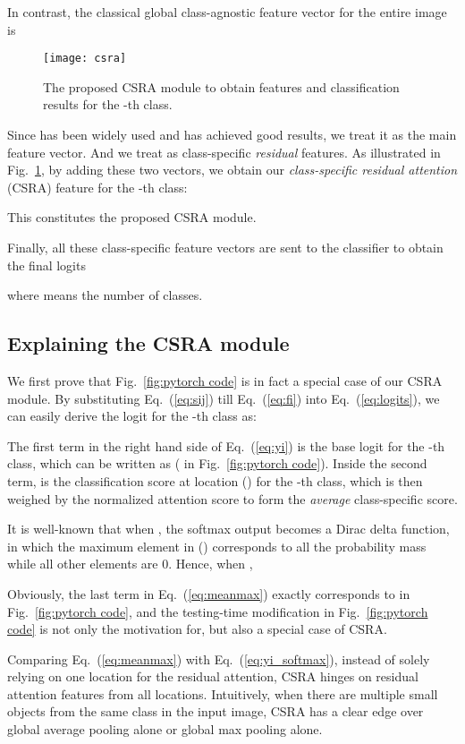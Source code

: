 \documentclass[10pt,twocolumn,letterpaper]{article}
\begin{document}
In contrast, the classical global class-agnostic feature vector for the entire image is


\begin{figure}
	\centering
	\texttt{[image: csra]}
	\caption{The proposed CSRA module to obtain features and classification results for the -th class.}
	\label{fig:CSRA}
\end{figure}

Since  has been widely used and has achieved good results, we treat it as the main feature vector. And we treat  as class-specific \emph{residual} features. As illustrated in Fig.~\ref{fig:CSRA}, by adding these two vectors, we obtain our \emph{class-specific residual attention} (CSRA) feature  for the -th class:

This constitutes the proposed CSRA module.

Finally, all these class-specific feature vectors are sent to the classifier to obtain the final logits

where  means the number of classes.

\subsection{Explaining the CSRA module}

We first prove that Fig.~\ref{fig:pytorch code} is in fact a special case of our CSRA module. By substituting Eq.~(\ref{eq:sij}) till Eq.~(\ref{eq:fi}) into Eq.~(\ref{eq:logits}), we can easily derive the logit for the -th class as:

The first term in the right hand side of Eq.~(\ref{eq:yi}) is the base logit for the -th class, which can be written as  ( in Fig.~\ref{fig:pytorch code}). Inside the second term,  is the classification score at location  () for the -th class, which is then weighed by the normalized attention score  to form the \emph{average} class-specific score.

It is well-known that when , the softmax output  becomes a Dirac delta function, in which the maximum element in  () corresponds to all the probability mass while all other elements are 0. Hence, when ,


Obviously, the last term in Eq.~(\ref{eq:meanmax}) exactly corresponds to  in Fig.~\ref{fig:pytorch code}, and the testing-time modification in Fig.~\ref{fig:pytorch code} is not only the motivation for, but also a special case of CSRA.

Comparing Eq.~(\ref{eq:meanmax}) with Eq.~(\ref{eq:yi_softmax}), instead of solely relying on one location for the residual attention, CSRA hinges on residual attention features from all locations. Intuitively, when there are multiple small objects from the same class in the input image, CSRA has a clear edge over global average pooling alone or global max pooling alone.
\end{document}
